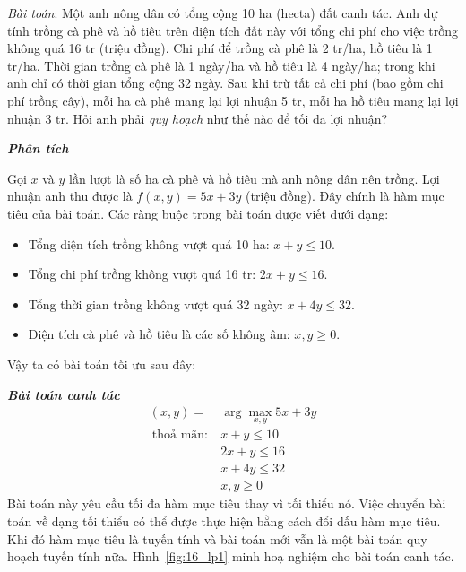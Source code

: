 \textit{{Bài toán}}:
Một anh nông dân có tổng cộng 10 ha (hecta) đất canh tác. Anh dự tính trồng cà
phê và hồ tiêu trên diện tích đất này với tổng chi phí cho việc trồng không quá 16 tr (triệu đồng). Chi phí để trồng cà phê là 2 tr/ha, hồ
tiêu là 1 tr/ha. Thời gian trồng cà phê là 1 ngày/ha và hồ tiêu là 4 ngày/ha;
trong khi anh chỉ có thời gian tổng cộng 32 ngày. Sau khi trừ tất cả chi
phí (bao gồm chi phí trồng cây), mỗi ha cà phê mang lại lợi nhuận 5 tr, mỗi ha hồ
tiêu mang lại lợi nhuận 3 tr. Hỏi anh phải \textit{quy hoạch} như thế nào để tối
đa lợi nhuận?

\newpage
\textit{\textbf{Phân tích}}

Gọi $x$ và $y$ lần lượt là số ha cà phê và hồ tiêu mà anh nông dân nên trồng.
Lợi nhuận anh thu được là $f(x, y) = 5x + 3y$ (triệu đồng). Đây chính là hàm
mục tiêu của bài toán. Các ràng buộc trong bài toán được viết dưới dạng:
\begin{itemize}
\item Tổng diện tích trồng không vượt quá 10 ha: $x + y \leq 10$.

\item Tổng chi phí trồng không vượt quá 16 tr: $2x + y \leq 16$.

\item Tổng thời gian trồng không vượt quá 32 ngày: $x + 4y \leq 32$.

\item Diện tích cà phê và hồ tiêu là các số không âm: $x, y \geq 0$.
\end{itemize}
Vậy ta có bài toán tối ưu sau đây:


\textit{\textbf{Bài toán canh tác} }
\begin{equation}
\label{eqn:canhtac}
\begin{aligned}
(x, y) =& \arg\max_{x, y} 5x + 3y \\\
\text{thoả mãn:}~ & x + y \leq 10 \\\
& 2x + y \leq 16 \\\
& x + 4y \leq 32 \\\
& x, y \geq 0
\end{aligned}
\end{equation}
Bài toán này yêu cầu {tối đa hàm mục tiêu} thay vì tối thiểu nó. Việc
chuyển bài toán về dạng {tối thiểu}  có thể được thực hiện bằng cách đổi dấu hàm mục tiêu. Khi đó hàm mục tiêu là tuyến tính và bài toán mới vẫn là một bài toán quy hoạch tuyến tính
nữa. Hình~\ref{fig:16_lp1} minh hoạ nghiệm cho bài toán canh tác.


